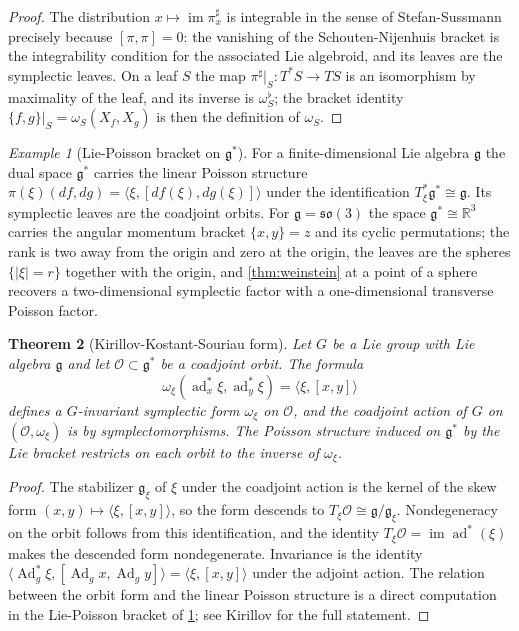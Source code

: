 \documentclass[11pt,letterpaper]{article}
\newtheorem{theorem}{Theorem}[section]
\theoremstyle{definition}
\theoremstyle{remark}
\newtheorem{example}[theorem]{Example}
\begin{document}
\begin{proof}
The distribution $x \mapsto \operatorname{im} \pi^{\sharp}_x$ is integrable in the sense of Stefan-Sussmann precisely because $[\pi, \pi] = 0$: the vanishing of the Schouten-Nijenhuis bracket is the integrability condition for the associated Lie algebroid, and its leaves are the symplectic leaves. On a leaf $S$ the map $\pi^{\sharp}|_S : T^{*}S \to TS$ is an isomorphism by maximality of the leaf, and its inverse is $\omega_S^{\flat}$; the bracket identity $\{f, g\}|_S = \omega_S(X_f, X_g)$ is then the definition of $\omega_S$.
\end{proof}

\begin{example}[Lie-Poisson bracket on $\mathfrak{g}^{*}$]
\label{ex:lie-poisson}
For a finite-dimensional Lie algebra $\mathfrak{g}$ the dual space $\mathfrak{g}^{*}$ carries the linear Poisson structure $\pi(\xi)(d f, d g) = \langle \xi, [d f(\xi), d g(\xi)] \rangle$ under the identification $T_{\xi}^{*} \mathfrak{g}^{*} \cong \mathfrak{g}$. Its symplectic leaves are the coadjoint orbits. For $\mathfrak{g} = \mathfrak{so}(3)$ the space $\mathfrak{g}^{*} \cong \mathbb{R}^{3}$ carries the angular momentum bracket $\{x, y\} = z$ and its cyclic permutations; the rank is two away from the origin and zero at the origin, the leaves are the spheres $\{|\xi| = r\}$ together with the origin, and \cref{thm:weinstein} at a point of a sphere recovers a two-dimensional symplectic factor with a one-dimensional transverse Poisson factor.
\end{example}

\begin{theorem}[Kirillov-Kostant-Souriau form]
\label{thm:kks}
Let $G$ be a Lie group with Lie algebra $\mathfrak{g}$ and let $\mathcal{O} \subset \mathfrak{g}^{*}$ be a coadjoint orbit. The formula
\[
\omega_{\xi}(\operatorname{ad}^{*}_{x} \xi, \operatorname{ad}^{*}_{y} \xi) = \langle \xi, [x, y] \rangle
\]
defines a $G$-invariant symplectic form $\omega_{\xi}$ on $\mathcal{O}$, and the coadjoint action of $G$ on $(\mathcal{O}, \omega_{\xi})$ is by symplectomorphisms. The Poisson structure induced on $\mathfrak{g}^{*}$ by the Lie bracket restricts on each orbit to the inverse of $\omega_{\xi}$.
\end{theorem}

\begin{proof}
The stabilizer $\mathfrak{g}_{\xi}$ of $\xi$ under the coadjoint action is the kernel of the skew form $(x, y) \mapsto \langle \xi, [x, y] \rangle$, so the form descends to $T_{\xi} \mathcal{O} \cong \mathfrak{g} / \mathfrak{g}_{\xi}$. Nondegeneracy on the orbit follows from this identification, and the identity $T_{\xi} \mathcal{O} = \operatorname{im} \operatorname{ad}^{*}(\xi)$ makes the descended form nondegenerate. Invariance is the identity $\langle \operatorname{Ad}^{*}_{g} \xi, [\operatorname{Ad}_{g} x, \operatorname{Ad}_{g} y] \rangle = \langle \xi, [x, y] \rangle$ under the adjoint action. The relation between the orbit form and the linear Poisson structure is a direct computation in the Lie-Poisson bracket of \cref{ex:lie-poisson}; see Kirillov \cite{kirillov} for the full statement.
\end{proof}
\end{document}
